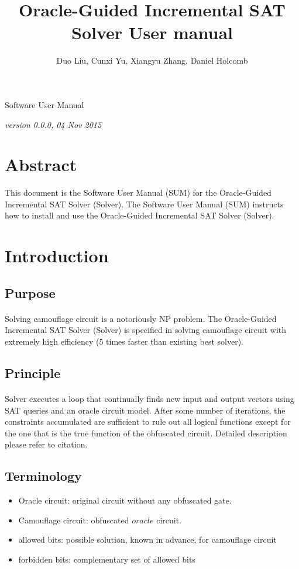 \documentclass{article}
\title{\Huge{Oracle-Guided Incremental SAT Solver User manual}}
\author{\small{Duo Liu, Cunxi Yu, Xiangyu Zhang, Daniel Holcomb}}
\date{}
\begin{document}
\maketitle
\centerline{\Large{Software User Manual}}
\vspace{10pt}
\centerline{\small{\emph{version 0.0.0, 04 Nov 2015}}}


\newpage
\section*{Abstract} 
	This document is the Software User Manual (SUM) for the Oracle-Guided Incremental SAT Solver (Solver). The Software User Manual (SUM) instructs how to install and use the Oracle-Guided Incremental SAT Solver (Solver). 
	
	
\newpage
\tableofcontents
\clearpage
\section{Introduction}
	\subsection{Purpose}
	\paragraph{} Solving camouflage circuit is a notoriously NP problem. The Oracle-Guided Incremental SAT Solver (Solver) is specified in solving camouflage circuit with extremely high efficiency (5 times faster than existing best solver).  		
	\subsection{Principle} 
	\paragraph{}Solver executes a loop that continually finds new input and output vectors using SAT queries and an oracle circuit model. After some number of iterations, the constraints accumulated are sufficient to rule out all logical functions except for the one that is the true function of the obfuscated circuit. Detailed description please refer to citation. 
	\subsection{Terminology}
		\begin{itemize}
			\item Oracle circuit: original circuit without any obfuscated gate.
			\item Camouflage circuit: obfuscated $oracle$ circuit.
			\item allowed bits: possible solution, known in advance, for camouflage circuit
			\item forbidden bits: complementary set of allowed bits
		\end{itemize}
\end{document}
